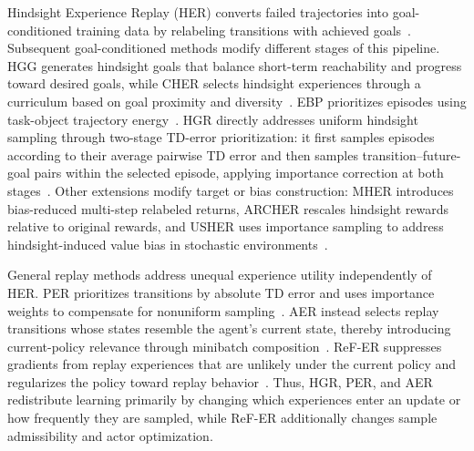 \documentclass[letterpaper]{article}
\begin{document}
Hindsight Experience Replay (HER) converts failed trajectories into goal-conditioned training data by relabeling transitions with achieved goals~\citep{andrychowicz2017her}. Subsequent goal-conditioned methods modify different stages of this pipeline. HGG generates hindsight goals that balance short-term reachability and progress toward desired goals, while CHER selects hindsight experiences through a curriculum based on goal proximity and diversity~\citep{ren2019hgg,fang2019cher}. EBP prioritizes episodes using task-object trajectory energy~\citep{zhao2018ebp}. HGR directly addresses uniform hindsight sampling through two-stage TD-error prioritization: it first samples episodes according to their average pairwise TD error and then samples transition--future-goal pairs within the selected episode, applying importance correction at both stages~\citep{luu2021hgr}. Other extensions modify target or bias construction: MHER introduces bias-reduced multi-step relabeled returns, ARCHER rescales hindsight rewards relative to original rewards, and USHER uses importance sampling to address hindsight-induced value bias in stochastic environments~\citep{yang2021mher,lanka2018archer,schramm2023usher}.

General replay methods address unequal experience utility independently of HER. PER prioritizes transitions by absolute TD error and uses importance weights to compensate for nonuniform sampling~\citep{schaul2015per}. AER instead selects replay transitions whose states resemble the agent's current state, thereby introducing current-policy relevance through minibatch composition~\citep{sun2020aer}. ReF-ER suppresses gradients from replay experiences that are unlikely under the current policy and regularizes the policy toward replay behavior~\citep{novati2019refer}. Thus, HGR, PER, and AER redistribute learning primarily by changing which experiences enter an update or how frequently they are sampled, while ReF-ER additionally changes sample admissibility and actor optimization.
\end{document}
